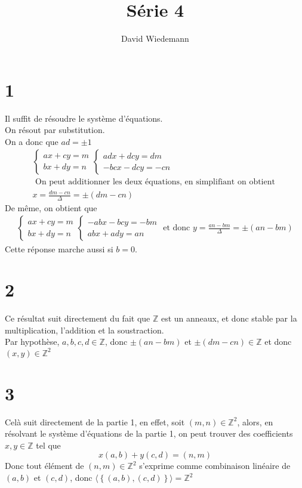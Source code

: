 \documentclass[11pt, a4paper, twoside]{article}
\begin{document}
\title{Série 4}
\author{David Wiedemann}
\maketitle
\section*{1}
Il suffit de résoudre le système d'équations.\\
On résout par substitution.\\
On a donc que $ad = \pm 1$
\begin{align*}
\begin{cases}
ax+ cy = m\\
bx + dy = n
\end{cases}
\begin{cases}
adx + dcy = dm\\
-bcx - dcy = -cn
\end{cases}\\
\text{ On peut additionner les deux équations, en simplifiant on obtient }\\
x  = \frac{dm-cn}{\Delta} =\pm( dm - cn )
\end{align*}
De même, on obtient que
\begin{align*}
	\begin{cases}
	ax+ cy = m\\
	bx + dy = n
	\end{cases}
\begin{cases}
	-abx -bcy = -bm\\
	abx + ady = an	
\end{cases}
\text{ et donc } 
y = \frac{an-bm}{\Delta}= \pm( an-bm )
\end{align*}
Cette réponse marche aussi si $b=0$.

\section*{2}

Ce résultat suit directement du fait que $\mathbb{Z}$ est un anneaux, et donc stable par la multiplication, l'addition et la soustraction.\\
Par hypothèse, $a, b,c,d \in \mathbb{Z}$, donc $\pm (an-bm)$ et $\pm ( dm-cn) \in \mathbb{Z}$ et donc $(x,y) \in \mathbb{Z}^{2}$
\section*{3}
Celà suit directement de la partie 1, en effet, soit $(m,n) \in \mathbb{Z}^{2}$, alors, en résolvant le  système d'équations de la partie 1, on peut trouver des coefficients $x, y \in \mathbb{Z}$ tel que 
\[ 
	x(a,b) + y(c,d) = ( n,m)
\]
Donc tout élément de $(n,m) \in \mathbb{Z}^{2}$ s'exprime comme combinaison linéaire de $(a,b)$ et $(c,d)$, donc
$\langle \left\{ ( a,b), ( c,d) \right\} \rangle = \mathbb{Z}^{2} $
\end{document}
